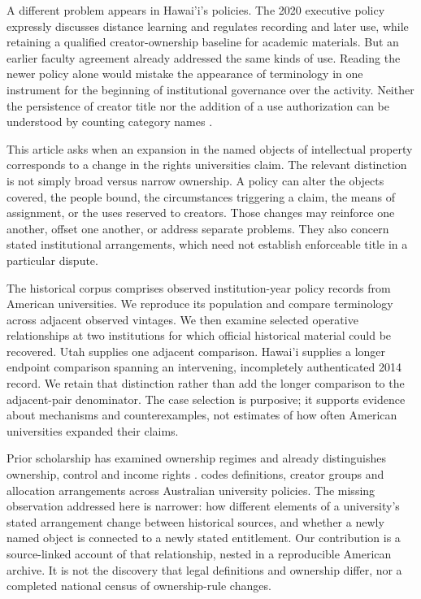 \documentclass[12pt]{article}
\begin{document}
A different problem appears in Hawai'i's policies. The 2020 executive policy expressly discusses distance learning and regulates recording and later use, while retaining a qualified creator-ownership baseline for academic materials. But an earlier faculty agreement already addressed the same kinds of use. Reading the newer policy alone would mistake the appearance of terminology in one instrument for the beginning of institutional governance over the activity. Neither the persistence of creator title nor the addition of a use authorization can be understood by counting category names \citep{hawaii1985,hawaii2020,hawaiicba2003}.

This article asks when an expansion in the named objects of intellectual property corresponds to a change in the rights universities claim. The relevant distinction is not simply broad versus narrow ownership. A policy can alter the objects covered, the people bound, the circumstances triggering a claim, the means of assignment, or the uses reserved to creators. Those changes may reinforce one another, offset one another, or address separate problems. They also concern stated institutional arrangements, which need not establish enforceable title in a particular dispute.

The historical corpus comprises \Observed{} observed institution-year policy records from \Universities{} American universities. We reproduce its population and compare terminology across \Pairs{} adjacent observed vintages. We then examine selected operative relationships at two institutions for which official historical material could be recovered. Utah supplies one adjacent comparison. Hawai'i supplies a longer endpoint comparison spanning an intervening, incompletely authenticated 2014 record. We retain that distinction rather than add the longer comparison to the adjacent-pair denominator. The case selection is purposive; it supports evidence about mechanisms and counterexamples, not estimates of how often American universities expanded their claims.

Prior scholarship has examined ownership regimes and already distinguishes ownership, control and income rights \citep{kenney2011,halilem2017}. \citet{jamali2024} codes definitions, creator groups and allocation arrangements across Australian university policies. The missing observation addressed here is narrower: how different elements of a university's stated arrangement change between historical sources, and whether a newly named object is connected to a newly stated entitlement. Our contribution is a source-linked account of that relationship, nested in a reproducible American archive. It is not the discovery that legal definitions and ownership differ, nor a completed national census of ownership-rule changes.
\end{document}
